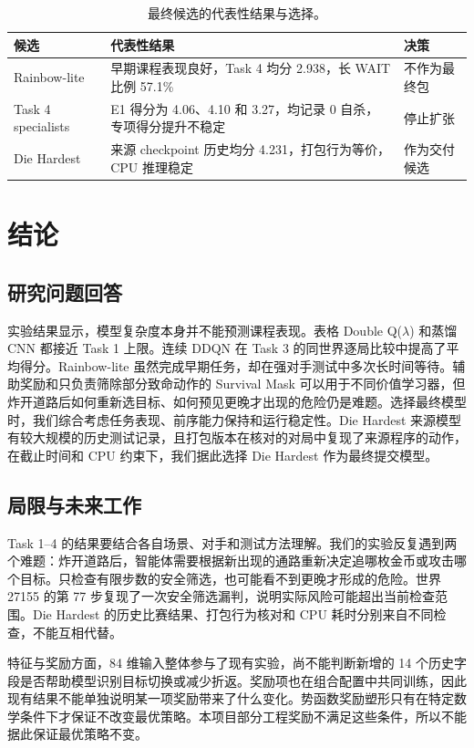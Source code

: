 \documentclass[UTF8,11pt,a4paper,fontset=none]{ctexart}
\begin{document}
\begin{table}[H]\centering\small
\caption{最终候选的代表性结果与选择。}\label{tab:final}
\begin{tabularx}{\linewidth}{lXX}\toprule
候选 & 代表性结果 & 决策\\\midrule
Rainbow-lite & 早期课程表现良好，Task 4 均分 2.938，长 WAIT 比例 57.1\% & 不作为最终包\\
Task 4 specialists & E1 得分为 4.06、4.10 和 3.27，均记录 0 自杀，专项得分提升不稳定 & 停止扩张\\
Die Hardest & 来源 checkpoint 历史均分 4.231，打包行为等价，CPU 推理稳定 & 作为交付候选\\\bottomrule
\end{tabularx}
\end{table}

\section{结论}
\subsection{研究问题回答}
实验结果显示，模型复杂度本身并不能预测课程表现。表格 Double Q($\lambda$) 和蒸馏 CNN 都接近 Task 1 上限。连续 DDQN 在 Task 3 的同世界逐局比较中提高了平均得分。Rainbow-lite 虽然完成早期任务，却在强对手测试中多次长时间等待。辅助奖励和只负责筛除部分致命动作的 Survival Mask 可以用于不同价值学习器，但炸开道路后如何重新选目标、如何预见更晚才出现的危险仍是难题。选择最终模型时，我们综合考虑任务表现、前序能力保持和运行稳定性。Die Hardest 来源模型有较大规模的历史测试记录，且打包版本在核对的对局中复现了来源程序的动作，在截止时间和 CPU 约束下，我们据此选择 Die Hardest 作为最终提交模型。

\subsection{局限与未来工作}
Task 1--4 的结果要结合各自场景、对手和测试方法理解。我们的实验反复遇到两个难题：炸开道路后，智能体需要根据新出现的通路重新决定追哪枚金币或攻击哪个目标。只检查有限步数的安全筛选，也可能看不到更晚才形成的危险。世界 27155 的第 77 步复现了一次安全筛选漏判，说明实际风险可能超出当前检查范围。Die Hardest 的历史比赛结果、打包行为核对和 CPU 耗时分别来自不同检查，不能互相代替。

特征与奖励方面，84 维输入整体参与了现有实验，尚不能判断新增的 14 个历史字段是否帮助模型识别目标切换或减少折返。奖励项也在组合配置中共同训练，因此现有结果不能单独说明某一项奖励带来了什么变化。势函数奖励塑形只有在特定数学条件下才保证不改变最优策略\citep{ng1999policy}。本项目部分工程奖励不满足这些条件，所以不能据此保证最优策略不变。
\end{document}
